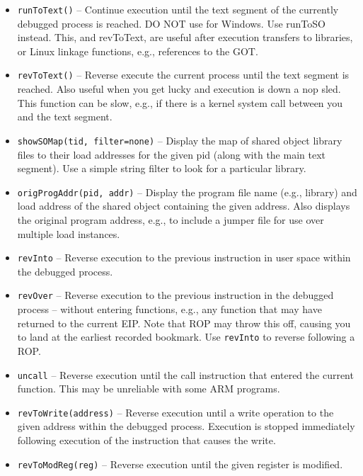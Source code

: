 \documentclass[titlepage]{article}
\begin{document}
\begin{itemize}
\item {\tt runToText()} – Continue execution until the text segment of the currently debugged process is reached.  DO NOT use for Windows.  Use runToSO instead. 
This, and revToText, are useful after execution transfers to libraries, or Linux linkage functions, e.g., references to the GOT.

\item {\tt revToText()} – Reverse execute the current process until the text segment is reached.  Also useful when you get lucky and execution is down a nop sled.  This function can be slow, e.g., if there is a kernel system call between you and the text segment.
 
\item {\tt showSOMap(tid, filter=none)} – Display the map of shared object library files to their load addresses for the given pid (along with the main text segment).
Use a simple string filter to look for a particular library.

\item {\tt origProgAddr(pid, addr)} – Display the program file name (e.g., library) and load address of the shared object containing the given address.  Also displays the 
original program address, e.g., to include a jumper file for use over multiple load instances.

\item {\tt revInto} – Reverse execution to the previous instruction in user space within the debugged process. 

\item {\tt revOver} – Reverse execution to the previous instruction in the debugged process – without entering functions, e.g., any function that may have returned to the current EIP.  Note that ROP may throw this off, causing you to land at the earliest recorded bookmark.  Use {\tt revInto} to reverse following a ROP.

\item {\tt uncall} – Reverse execution until the call instruction that entered the current function.  This may be unreliable with some ARM
programs.

\item {\tt revToWrite(address)} – Reverse execution until a write operation to the given address within the debugged process. Execution is stopped immediately
following execution of the instruction that causes the write.

\item {\tt revToModReg(reg)} – Reverse execution until the given register is modified.



\end{itemize}
\end{document}
